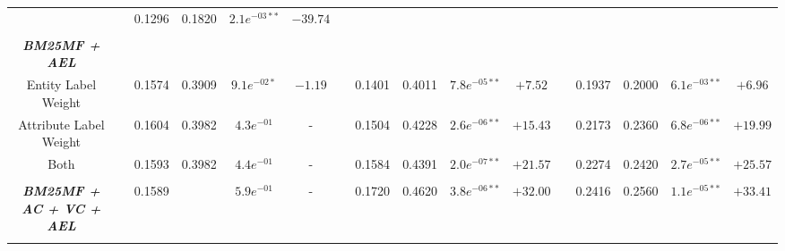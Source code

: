 \begin{table*}
{\begin{tabular}{cc@{\hs}rrccc@{\hs}rrccc@{\hs}rrcc}
                                                   & \phantom{a} & 0.1296 & 0.1820 & $2.1e^{-03**}$ & $-39.74$ \\
\\
\emph{\textbf{BM25MF + AEL}} & \multicolumn{15}{c}{\phantom{a}} \\
{\raggedright Entity Label Weight} & \phantom{a} & 0.1574 & 0.3909 & $9.1e^{-02*}$ & $-1.19$
                                   & \phantom{a} & 0.1401 & 0.4011 & $7.8e^{-05**}$ & $+7.52$
                                   & \phantom{a} & 0.1937 & 0.2000 & $6.1e^{-03**}$ & $+6.96$ \\
{\raggedright Attribute Label Weight} & \phantom{a} & 0.1604 & 0.3982 & $4.3e^{-01}$ & -
                                      & \phantom{a} & 0.1504 & 0.4228 & $2.6e^{-06**}$ & $+15.43$
                                      & \phantom{a} & 0.2173 & 0.2360 & $6.8e^{-06**}$ & $+19.99$ \\
{\raggedright Both} & \phantom{a} & 0.1593 & 0.3982 & $4.4e^{-01}$ & -
                    & \phantom{a} & 0.1584 & 0.4391 & $2.0e^{-07**}$ & $+21.57$
                    & \phantom{a} & 0.2274 & 0.2420 & $2.7e^{-05**}$ & $+25.57$ \\
\\
\emph{\textbf{BM25MF + AC + VC + AEL}} & \phantom{a} & 0.1589 &  & $5.9e^{-01}$ & -
                                       & \phantom{a} & 0.1720 & 0.4620 & $3.8e^{-06**}$ & $+32.00$
                                       & \phantom{a} & 0.2416 & 0.2560 & $1.1e^{-05**}$ & $+33.41$ \\
\midrule
\\[-0.2cm]


\end{tabular}}
\end{table*}

